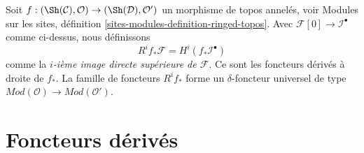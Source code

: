 \medskip\noindent
Soit $f : (\Sh(\mathcal{C}), \mathcal{O}) \to (\Sh(\mathcal{D}), \mathcal{O}')$
un morphisme de topos annelés, voir
Modules sur les sites, définition \ref{sites-modules-definition-ringed-topos}.
Avec $\mathcal{F}[0] \to \mathcal{I}^\bullet$ comme ci-dessus,
nous définissons
\begin{equation}
\label{equation-higher-direct-image-modules}
R^if_*\mathcal{F} = H^i(f_*\mathcal{I}^\bullet)
\end{equation}
comme la {\it $i$-ième image directe supérieure de $\mathcal{F}$}.
Ce sont les foncteurs dérivés à droite de $f_*$.
La famille de foncteurs $R^if_*$ forme un $\delta$-foncteur universel
de type $\textit{Mod}(\mathcal{O}) \to \textit{Mod}(\mathcal{O}')$.








\section{Foncteurs dérivés}
\label{section-derived-functors}

